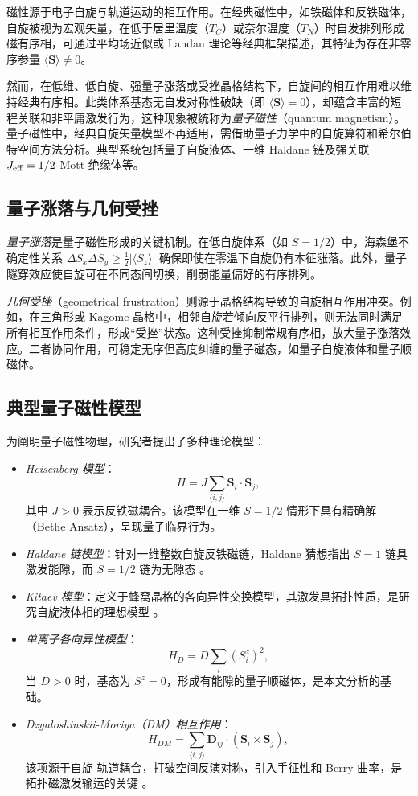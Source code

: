 磁性源于电子自旋与轨道运动的相互作用。在经典磁性中，如铁磁体和反铁磁体，自旋被视为宏观矢量，在低于居里温度（$T_C$）或奈尔温度（$T_N$）时自发排列形成磁有序相，可通过平均场近似或 Landau 理论等经典框架描述，其特征为存在非零序参量 $\langle \mathbf{S} \rangle \neq 0$。

然而，在低维、低自旋、强量子涨落或受挫晶格结构下，自旋间的相互作用难以维持经典有序相。此类体系基态无自发对称性破缺（即 $\langle \mathbf{S} \rangle = 0$），却蕴含丰富的短程关联和非平庸激发行为，这种现象被统称为\emph{量子磁性}（quantum magnetism）\cite{knolle2019Field,rau2016SpinOrbit}。量子磁性中，经典自旋矢量模型不再适用，需借助量子力学中的自旋算符和希尔伯特空间方法分析。典型系统包括量子自旋液体、一维 Haldane 链及强关联 $J_{\rm eff}=1/2$ Mott 绝缘体等。

\subsection{量子涨落与几何受挫}

\emph{量子涨落}是量子磁性形成的关键机制。在低自旋体系（如 $S=1/2$）中，海森堡不确定性关系 $\Delta S_x \Delta S_y \geq \frac{1}{2} |\langle S_z \rangle|$ 确保即使在零温下自旋仍有本征涨落。此外，量子隧穿效应使自旋可在不同态间切换，削弱能量偏好的有序排列。

\emph{几何受挫}（geometrical frustration）则源于晶格结构导致的自旋相互作用冲突。例如，在三角形或 Kagome 晶格中，相邻自旋若倾向反平行排列，则无法同时满足所有相互作用条件，形成“受挫”状态。这种受挫抑制常规有序相，放大量子涨落效应。二者协同作用，可稳定无序但高度纠缠的量子磁态，如量子自旋液体和量子顺磁体。

\subsection{典型量子磁性模型}

为阐明量子磁性物理，研究者提出了多种理论模型：
\begin{itemize}
    \item \emph{Heisenberg 模型}：
    \[
    H = J \sum_{\langle i,j \rangle} \mathbf{S}_i \cdot \mathbf{S}_j,
    \]
    其中 $J>0$ 表示反铁磁耦合。该模型在一维 $S=1/2$ 情形下具有精确解（Bethe Ansatz），呈现量子临界行为。
    \item \emph{Haldane 链模型}：针对一维整数自旋反铁磁链，Haldane 猜想指出 $S=1$ 链具激发能隙，而 $S=1/2$ 链为无隙态 \cite{haldane1983Continuum}。
    \item \emph{Kitaev 模型}：定义于蜂窝晶格的各向异性交换模型，其激发具拓扑性质，是研究自旋液体相的理想模型 \cite{kitaev2006Anyons}。
    \item \emph{单离子各向异性模型}：
    \[
    H_D = D \sum_i (S^z_i)^2,
    \]
    当 $D>0$ 时，基态为 $S^z=0$，形成有能隙的量子顺磁体，是本文分析的基础。
    \item \emph{Dzyaloshinskii-Moriya（DM）相互作用}：
    \[
    H_{DM} = \sum_{\langle i,j \rangle} \mathbf{D}_{ij} \cdot (\mathbf{S}_i \times \mathbf{S}_j),
    \]
    该项源于自旋-轨道耦合，打破空间反演对称，引入手征性和 Berry 曲率，是拓扑磁激发输运的关键 \cite{dzyaloshinsky1958thermodynamic}。
\end{itemize}

